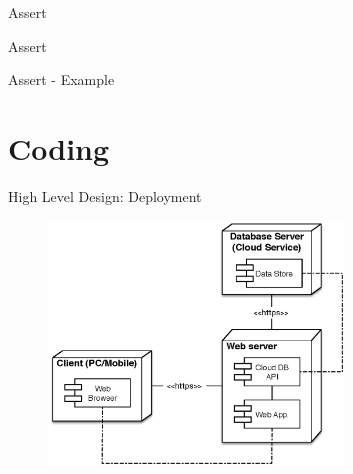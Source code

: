 \documentclass[14pt]{beamer}
\begin{document}
\begin{frame}[plain]{Assert}
\end{frame}

\begin{frame}[plain]{Assert}
    \Large{
    }
\end{frame}

\begin{frame}[plain]{Assert - Example}
    \Large{
    }
\end{frame}

\section{Coding}

\begin{frame}[plain]{High Level Design: Deployment}
    \begin{figure}
        \center
        \includegraphics[width=0.7\textwidth]{deployment-grading-system}
        \label{fig:deployment-grading-system}
    \end{figure}
\end{frame}
\end{document}
